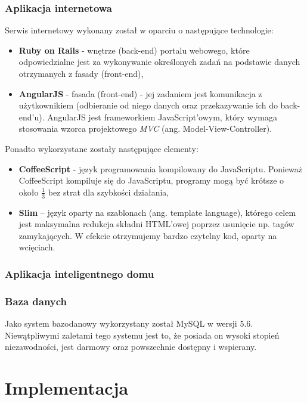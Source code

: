 \documentclass[eng,oneside]{mgr}
\begin{document}
\subsection{Aplikacja internetowa}
Serwis internetowy wykonany został w oparciu o następujące technologie:
\begin{itemize}
	\item \textbf{Ruby on Rails} - wnętrze (back-end) portalu webowego, które odpowiedzialne jest za wykonywanie określonych zadań na podstawie danych otrzymanych z fasady (front-end),
	\item \textbf{AngularJS} - fasada (front-end) - jej zadaniem jest komunikacja z użytkownikiem (odbieranie od niego danych oraz przekazywanie ich do back-end'u). AngularJS jest frameworkiem JavaScript'owym, który wymaga stosowania wzorca projektowego \emph{MVC} (ang. Model-View-Controller).
\end{itemize}
Ponadto wykorzystane zostały następujące elementy:
\begin{itemize}
	\item \textbf{CoffeeScript} - język programowania kompilowany do JavaScriptu. Ponieważ CoffeeScript kompiluje się do JavaScriptu, programy mogą być krótsze o około $\frac{1}{3}$ bez strat dla szybkości działania,
	\item \textbf{Slim} – język oparty na szablonach (ang. template language), którego celem jest maksymalna redukcja składni HTML’owej poprzez usunięcie np. tagów zamykających. W efekcie otrzymujemy bardzo czytelny kod, oparty na wcięciach.
\end{itemize}

\subsection{Aplikacja inteligentnego domu} %
\label{sub:aplikacja_inteligentnego_domu}


\subsection{Baza danych}
Jako system bazodanowy wykorzystany został MySQL w wersji 5.6. Niewątpliwymi zaletami tego systemu jest to, że posiada on wysoki stopień niezawodności, jest darmowy oraz powszechnie dostępny i wspierany.

\chapter{Implementacja}
\end{document}
